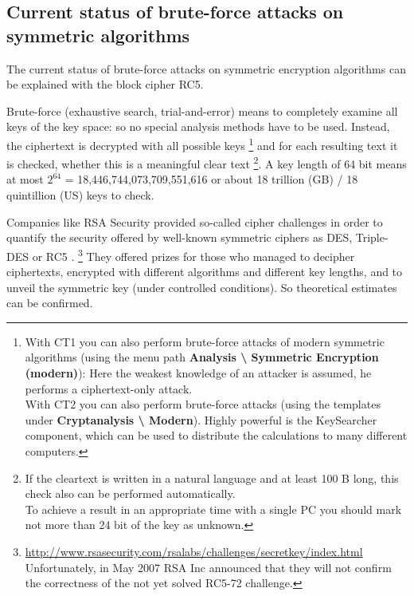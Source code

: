 \subsection{Current status of brute-force attacks on symmetric algorithms}
\label{Brute-force-gegen-Symmetr}

The current status of brute-force attacks on symmetric encryption algorithms can be explained with the block cipher RC5.

Brute-force (exhaustive search, trial-and-error) means to completely examine all keys of the key space: so no special analysis methods have to be used. Instead, the ciphertext is decrypted with all possible keys%
\footnote{%
    With CT1 you can also perform brute-force attacks
    of modern symmetric algorithms (using the menu path
    {\bf Analysis \textbackslash{} Symmetric Encryption (modern)}): Here
    the weakest knowledge of an attacker is assumed, he performs a 
    ciphertext-only attack.\\
    With CT2 you can also perform brute-force attacks
    (using the templates under {\bf Cryptanalysis \textbackslash{} Modern}).
    Highly powerful is the KeySearcher component, which can be used to
    distribute the calculations to many different computers.
}
and for each resulting text it is checked, whether this is a meaningful clear text%
\footnote{%
    If the cleartext is written in a natural language and at least 100 B
    long, this check also can be performed automatically.\\
    To achieve a result in an appropriate time with a single PC you should 
    mark not more than 24 bit of the key as unknown.
}.
A key length of 64 bit means at most $2^{64}$ = 18,446,744,073,709,551,616 or about 18 trillion (GB) / 18 quintillion (US)  keys to check.

Companies like RSA Security provided so-called cipher challenges in order
to quantify the security offered by well-known symmetric ciphers as DES,
Triple-DES or RC5%
.%
\footnote{%
 \url{http://www.rsasecurity.com/rsalabs/challenges/secretkey/index.html}\\
 Unfortunately, in May 2007 RSA Inc announced that they will not confirm the
 correctness of the not yet solved RC5-72 challenge.}
They offered prizes for those who managed to decipher ciphertexts, encrypted with different algorithms and different key lengths, and to unveil the symmetric key (under controlled conditions). So theoretical estimates can be confirmed.

